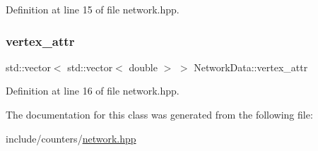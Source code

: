 Definition at line 15 of file network.\+hpp.

\mbox{\label{class_network_data_a3dc3e5549abc6daa85f30dbdc504ecac}} 
\subsubsection{\texorpdfstring{vertex\+\_\+attr}{vertex\_attr}}
{\footnotesize\ttfamily std\+::vector$<$ std\+::vector$<$ double $>$ $>$ Network\+Data\+::vertex\+\_\+attr}



Definition at line 16 of file network.\+hpp.



The documentation for this class was generated from the following file\+:\begin{DoxyCompactItemize}
\item 
include/counters/\hyperlink{network_8hpp}{network.\+hpp}\end{DoxyCompactItemize}
